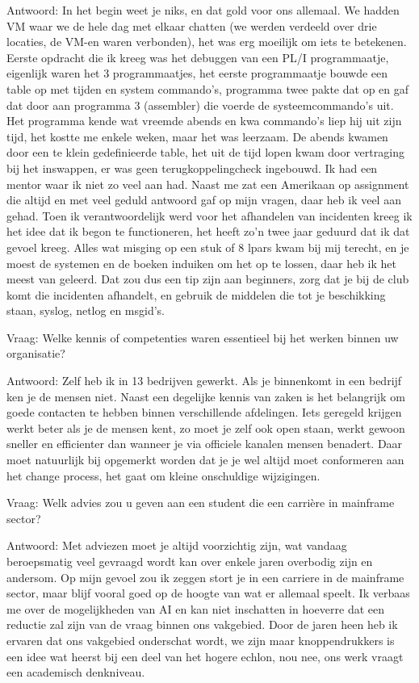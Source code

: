 Antwoord: In het begin weet je niks, en dat gold voor ons allemaal. We hadden VM
waar we de hele dag met elkaar chatten (we werden verdeeld over drie
locaties, de VM-en waren verbonden), het was erg moeilijk om iets te
betekenen.
Eerste opdracht die ik kreeg was het debuggen van een PL/I
programmaatje, eigenlijk waren het 3 programmaatjes, het eerste
programmaatje bouwde een table op met tijden en system commando’s,
programma twee pakte dat op en gaf dat door aan programma 3 (assembler)
die voerde de systeemcommando’s uit.
Het programma kende wat vreemde abends en kwa commando’s liep hij uit
zijn tijd, het kostte me enkele weken, maar het was leerzaam. De abends
kwamen door een te klein gedefinieerde table, het uit de tijd lopen kwam
door vertraging bij het inswappen, er was geen terugkoppelingcheck
ingebouwd.
Ik had een mentor waar ik niet zo veel aan had. Naast me zat een
Amerikaan op assignment die altijd en met veel geduld antwoord gaf op
mijn vragen, daar heb ik veel aan gehad.
Toen ik verantwoordelijk werd voor het afhandelen van incidenten kreeg
ik het idee dat ik begon te functioneren, het heeft zo’n twee jaar
geduurd dat ik dat gevoel kreeg. Alles wat misging op een stuk of 8
lpars kwam bij mij terecht, en je moest de systemen en de boeken
induiken om het op te lossen, daar heb ik het meest van geleerd.
Dat zou dus een tip zijn aan beginners, zorg dat je bij de club komt die
incidenten afhandelt, en gebruik de middelen die tot je beschikking
staan, syslog, netlog en msgid’s.

Vraag: Welke kennis of competenties waren essentieel bij het werken binnen
uw organisatie?

Antwoord: Zelf heb ik in 13 bedrijven gewerkt. Als je binnenkomt in een bedrijf
ken je de mensen niet. Naast een degelijke kennis van zaken is het
belangrijk om goede contacten te hebben binnen verschillende afdelingen.
Iets geregeld krijgen werkt beter als je de mensen kent, zo moet je zelf
ook open staan, werkt gewoon sneller en efficienter dan wanneer je via
officiele kanalen mensen benadert. Daar moet natuurlijk bij  opgemerkt
worden dat je je wel altijd moet conformeren aan het change process, het
gaat om kleine onschuldige wijzigingen.

Vraag: Welk advies zou u geven aan een student die een carrière in
mainframe sector?

Antwoord: Met adviezen moet je altijd voorzichtig zijn, wat vandaag beroepsmatig
veel gevraagd wordt kan over enkele jaren overbodig zijn en andersom.
Op mijn gevoel zou ik zeggen stort je in een carriere in de mainframe
sector, maar blijf vooral goed op de hoogte van wat er allemaal speelt.
Ik verbaas me over de mogelijkheden van AI en kan niet inschatten in
hoeverre dat een reductie zal zijn van de vraag binnen ons vakgebied.
Door de jaren heen heb ik ervaren dat ons vakgebied onderschat wordt, we
zijn maar knoppendrukkers is een idee wat heerst bij een deel van het
hogere echlon, nou nee, ons werk vraagt een academisch denkniveau.

